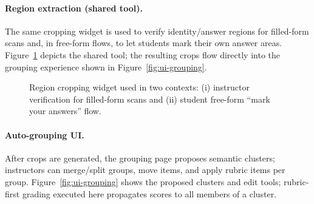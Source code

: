 \documentclass[ms,twoside,print]{nuthesis}
\begin{document}
\paragraph{Region extraction (shared tool).}
The same cropping widget is used to verify identity/answer regions for filled-form scans and, in free-form flows, to let students mark their own answer areas. Figure~\ref{fig:ui-crops} depicts the shared tool; the resulting crops flow directly into the grouping experience shown in Figure~\ref{fig:ui-grouping}.

\begin{figure}[htb]
  \centering
  \caption{Region cropping widget used in two contexts: (i) instructor verification for filled-form scans and (ii) student free-form ``mark your answers'' flow.}
  \label{fig:ui-crops}
\end{figure}

\paragraph{Auto-grouping UI.}
After crops are generated, the grouping page proposes semantic clusters; instructors can merge/split groups, move items, and apply rubric items per group. Figure~\ref{fig:ui-grouping} shows the proposed clusters and edit tools; rubric-first grading executed here propagates scores to all members of a cluster.
\end{document}

